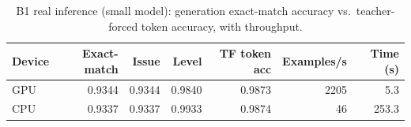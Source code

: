 \begin{table}[t]\centering
\caption{B1 real inference (small model): generation exact-match accuracy vs.\ teacher-forced token accuracy, with throughput.}
\begin{tabular}{lrrrrrr}
\hline
Device & Exact-match & Issue & Level & TF token acc & Examples/s & Time (s) \\
\hline
GPU & 0.9344 & 0.9344 & 0.9840 & 0.9873 & 2205 & 5.3 \\
CPU & 0.9337 & 0.9337 & 0.9933 & 0.9874 & 46 & 253.3 \\
\hline
\end{tabular}
\end{table}
